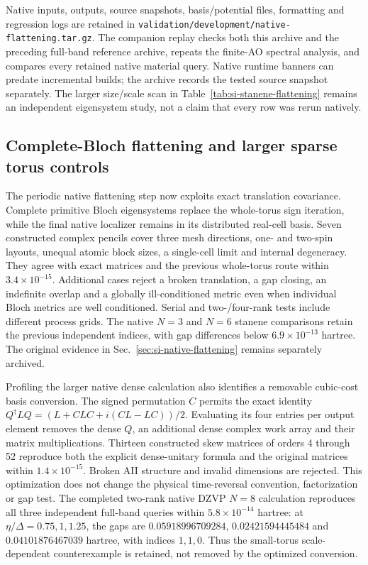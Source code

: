 \documentclass[11pt]{article}
\begin{document}
Native inputs, outputs, source snapshots, basis/potential files,
formatting and regression logs are retained in
\nolinkurl{validation/development/native-flattening.tar.gz}.
The companion replay checks both this archive and the preceding
full-band reference archive, repeats the finite-AO spectral analysis,
and compares every retained native material query. Native runtime
banners can predate incremental builds; the archive records the
tested source snapshot separately. The larger size/scale scan in
Table~\ref{tab:si-stanene-flattening} remains an independent
eigensystem study, not a claim that every row was rerun natively.

\subsection{Complete-Bloch flattening and larger sparse torus controls}
\label{sec:si-stanene-large-torus}
The periodic native flattening step now exploits exact translation
covariance. Complete primitive Bloch eigensystems replace the
whole-torus sign iteration, while the final native localizer
remains in its distributed real-cell basis. Seven constructed
complex pencils cover three mesh directions, one- and two-spin
layouts, unequal atomic block sizes, a single-cell limit and
internal degeneracy. They agree with exact matrices and the
previous whole-torus route within $3.4\times10^{-15}$.
Additional cases reject a broken translation, a gap closing, an
indefinite overlap and a globally ill-conditioned metric even
when individual Bloch metrics are well conditioned.
Serial and two-/four-rank tests include different process grids.
The native $N=3$ and $N=6$ stanene comparisons retain the
previous independent indices, with gap differences below
$6.9\times10^{-13}$ hartree. The original evidence in
Sec.~\ref{sec:si-native-flattening} remains separately archived.

Profiling the larger native dense calculation also identifies a
removable cubic-cost basis conversion. The signed permutation
$C$ permits the exact identity
$Q^\dagger LQ=(L+CLC+i(CL-LC))/2$. Evaluating its four entries
per output element removes the dense $Q$, an additional dense
complex work array and their matrix multiplications. Thirteen
constructed skew matrices of orders 4 through 52 reproduce both
the explicit dense-unitary formula and the original matrices
within $1.4\times10^{-15}$. Broken AII structure and invalid
dimensions are rejected. This optimization does not change the
physical time-reversal convention, factorization or gap test.
The completed two-rank native DZVP $N=8$ calculation reproduces
all three independent full-band queries within
$5.8\times10^{-14}$ hartree: at $\eta/\Delta=0.75,1,1.25$,
the gaps are $0.05918996709284$, $0.02421594445484$ and
$0.04101876467039$ hartree, with indices $1,1,0$.
Thus the small-torus scale-dependent counterexample is retained,
not removed by the optimized conversion.
\end{document}
